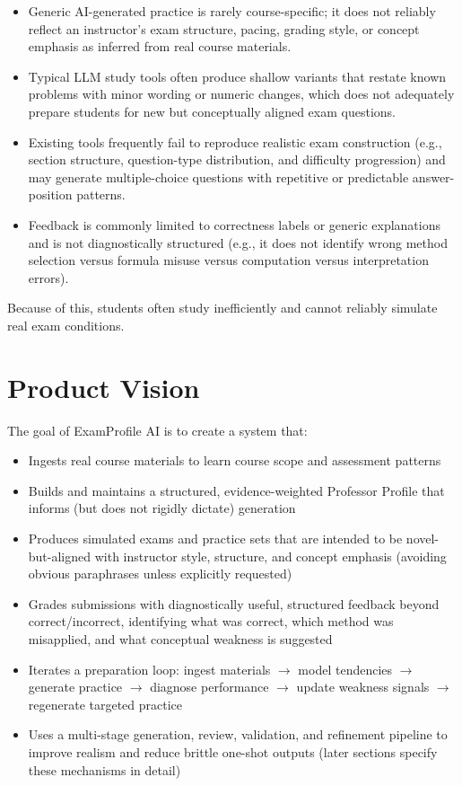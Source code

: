 \documentclass[11pt]{article}
\begin{document}
\begin{itemize}
\item Generic AI-generated practice is rarely course-specific; it does not reliably reflect an instructor's exam structure, pacing, grading style, or concept emphasis as inferred from real course materials.
\item Typical LLM study tools often produce shallow variants that restate known problems with minor wording or numeric changes, which does not adequately prepare students for new but conceptually aligned exam questions.
\item Existing tools frequently fail to reproduce realistic exam construction (e.g., section structure, question-type distribution, and difficulty progression) and may generate multiple-choice questions with repetitive or predictable answer-position patterns.
\item Feedback is commonly limited to correctness labels or generic explanations and is not diagnostically structured (e.g., it does not identify wrong method selection versus formula misuse versus computation versus interpretation errors).
\end{itemize}

Because of this, students often study inefficiently and cannot reliably simulate real exam conditions.

\section{Product Vision}
The goal of ExamProfile AI is to create a system that:
\begin{itemize}
\item Ingests real course materials to learn course scope and assessment patterns
\item Builds and maintains a structured, evidence-weighted Professor Profile that informs (but does not rigidly dictate) generation
\item Produces simulated exams and practice sets that are intended to be novel-but-aligned with instructor style, structure, and concept emphasis (avoiding obvious paraphrases unless explicitly requested)
\item Grades submissions with diagnostically useful, structured feedback beyond correct/incorrect, identifying what was correct, which method was misapplied, and what conceptual weakness is suggested
\item Iterates a preparation loop: ingest materials $\rightarrow$ model tendencies $\rightarrow$ generate practice $\rightarrow$ diagnose performance $\rightarrow$ update weakness signals $\rightarrow$ regenerate targeted practice
\item Uses a multi-stage generation, review, validation, and refinement pipeline to improve realism and reduce brittle one-shot outputs (later sections specify these mechanisms in detail)
\end{itemize}
\end{document}
